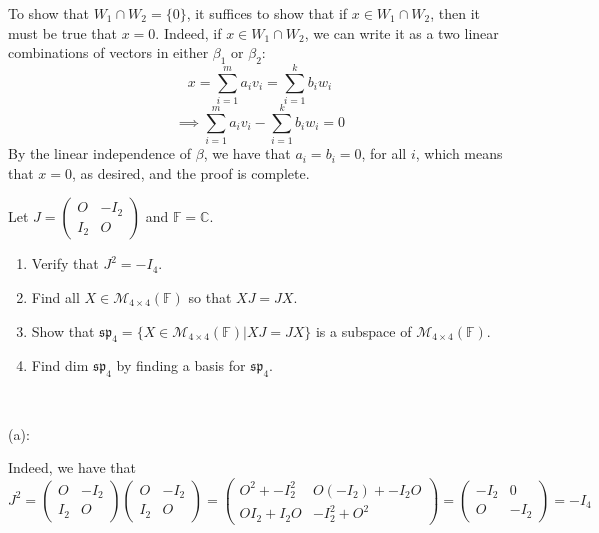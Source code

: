 \documentclass{article}
\theoremstyle{plain} %
\numberwithin{thm}{section} %
\theoremstyle{definition}
\begin{document}
\begin{question}{9}
        To show that \(W_1 \cap W_2 = \{ 0 \}\), it suffices to show that if \(x \in W_1 \cap W_2\), then it must be true that \(x = 0\). Indeed, if \(x \in W_1 \cap W_2\), we can write it as a two linear combinations of vectors in either \(\beta _1\) or \(\beta _2\):
        \[
            x = \sum_{i=1}^{m} a_i v_i = \sum_{i=1}^{k} b_i w_i
        \]
        \[
            \implies \sum_{i=1}^{m} a_i v_i - \sum_{i=1}^{k} b_i w_i = 0
        \]
        By the linear independence of \(\beta\), we have that \(a_i = b_i = 0\), for all \(i\), which means that \(x = 0\), as desired, and the proof is complete.
    \end{question}
    \newpage
    \begin{question}{10}
        Let \( J = \left( \begin{array}{c|c} O & -I_2 \\ \hline I_2 & O \end{array} \right) \) and \( \mathbb{F} = \mathbb{C} \).
        
        \begin{enumerate}[label=(\alph*)]
            \item Verify that \( J^2 = -I_4 \).
            \item Find all \( X \in \mathcal{M}_{4\times 4}(\mathbb{F}) \) so that \( XJ = JX \).
            \item Show that \( \mathfrak{sp}_4 = \{ X \in \mathcal{M}_{4\times 4}(\mathbb{F}) | XJ = JX \} \) is a subspace of \( \mathcal{M}_{4\times 4}(\mathbb{F}) \).
            \item Find dim \( \mathfrak{sp}_4 \) by finding a basis for \( \mathfrak{sp}_4 \).
        \end{enumerate}
        \tcblower
        \ 

        (a):

        Indeed, we have that
        \[
            J^2 = \left( \begin{array}{c|c} O & -I_2 \\ \hline I_2 & O \end{array} \right) \left( \begin{array}{c|c} O & -I_2 \\ \hline I_2 & O \end{array} \right) = \left( \begin{array}{c|c} O^2 + -I_2^2 & O(-I_2) + -I_2 O \\ \hline OI_2 + I_2 O & - I_2^2 + O^2 \end{array} \right) = \left( \begin{array}{c|c} -I_2 & 0 \\ \hline O & -I_2 \end{array} \right) = -I_4
        \]


\end{question}
\end{document}

